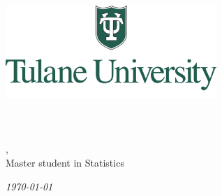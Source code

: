 \begin{titlepage}
    \begin{center}    
    \includegraphics[width=0.6\textwidth]{TU.png}\\[1cm]    
    
    {\Huge \CN}\\[0.5cm]
    \textsc{\large \Pf}\\[1.0cm]
    
    \textsc{\LARGE \Ti}\\[0.5cm]
    \textsc{\large \LN, \FN}\\
    {Master student in Statistics}
    
    
    \vfill
    
    {\Large \emph{\today}}
    
    \end{center}
\end{titlepage}

